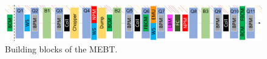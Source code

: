 \begin{figure}[!ht]
	\begin{center}
		\includegraphics[width=\textwidth]{02_BeamDiag/figures/fig000_MEBT}
	\end{center}
	\caption[Building blocks of the MEBT]{Building blocks of the MEBT.}
	\label{chap2:fig:MEBT}
\end{figure}

